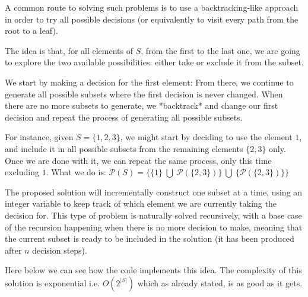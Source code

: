 A common route to solving such problems is to use a backtracking-like approach in order to try all possible
decisions (or equivalently to visit every path from the root to a leaf).

The idea is that, for all elements of $S$, from the first to the last one, we are going to
explore the two available possibilities: either take or exclude
it from the subset.

We start by making a decision for the first element: From there, we continue to generate all possible subsets
where the first decision is never changed. 
When there are no more subsets to generate, we *backtrack* and change our first
decision and repeat the process of generating all possible subsets.


For instance, given $S=\{1,2,3\}$, we might start by deciding to use the element $1$, and include it in all possible subsets from the remaining elements $\{2, 3\}$ only. 
Once we are done with it, we can repeat the same process, only this time excluding $1$. What we do is: $\mathcal{P}(S)= \{\{1\} \; \bigcup \;\mathcal{P}(\{2,3\})\} \: \bigcup \: \{\mathcal{P}(\{2,3\})\}\} 
$

The proposed solution will incrementally construct one subset at a time, 
using an integer variable to keep track of which element we are currently taking the decision for.
This type of problem is naturally solved recursively, with a base case of the recursion happening when there is no more decision
to make, meaning that the current subset is ready to be included in the solution (it has been
produced after $n$ decision steps).

Here below we can see how the \CC code implements this idea. The complexity of this solution is exponential i.e. $O(2^{|S|})$ which as already stated, is as good as
it gets.





